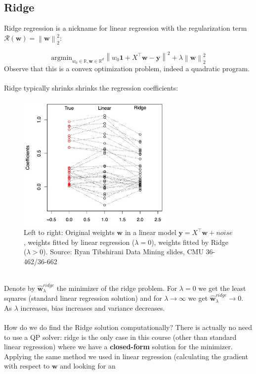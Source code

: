 \documentclass[11pt]{article}
\newcommand{\norm}[1]{\left\| #1\right\|}
\newcommand{\R}{\ensuremath{\mathbb{R}}}
\newcommand{\Tr}{\ensuremath{\top}}
\newcommand{\Rc}{\mathcal{R}}
\newcommand{\V}[1]{\mathbf{#1}}
\begin{document}
\subsection{Ridge}

Ridge regression is a nickname for linear regression with the regularization term
$\Rc(\V{w})=\norm{\V{w}}_2^2$:

\[
      \text{argmin}_{w_0\in\R,\V{w}\in\R^{d}} \norm{ w_0\mathbf{1} + X^\Tr\V{w} -\V{y}  }^2
+  \lambda \norm{\V{w}}^2_2
    \]
    Observe that this is a convex optimization problem, indeed a quadratic
    program. 
\\~\\
Ridge typically shrinks shrinks the regression coefficients:
    \begin{figure}[h!]
      \centering
      \includegraphics[width=3in]{ridge_coefs.jpeg}
      \caption{Left to right:
        Original weights $\V{w}$ in a linear model $\V{y}=X^\Tr
        \V{w} + noise$, weights fitted by linear regression ($\lambda=0$),
      weights fitted by Ridge ($\lambda>0$). Source: Ryan Tibshirani Data Mining slides, CMU 36-462/36-662 }
    \end{figure}
~\\
Denote by $\hat{\V{w}}_\lambda^{ridge}$ the
minimizer of the ridge problem. For $\lambda=0$ we get the least squares
(standard linear regression solution) and  for $\lambda\to\infty$ we get 
$\hat{\V{w}}_\lambda^{ridge}\to0$. As $\lambda$ increases, bias  increases and
variance decreases. 
\\~\\
How do we do find the Ridge solution computationally?
There is actually no need to use a QP solver: ridge is the only case in this
course (other than standard linear regression) where we have a 
{\bf closed-form}
solution for the minimizer. Applying the same method we used in linear
regression (calculating the gradient with respect to $\V{w}$ and looking for an
\end{document}
